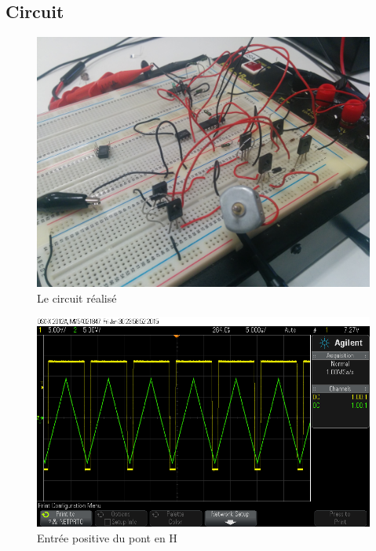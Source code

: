 \documentclass[a4paper]{article}
\begin{document}
\subsection{Circuit}

\begin{figure}[h!]
  \centering
    \includegraphics[width=1\textwidth]{circuit}
  \caption{Le circuit réalisé}
\end{figure}

\begin{figure}[h!]
  \centering
    \includegraphics[width=1\textwidth]{scope_1}
  \caption{Entrée positive du pont en H}
\end{figure}
\end{document}
